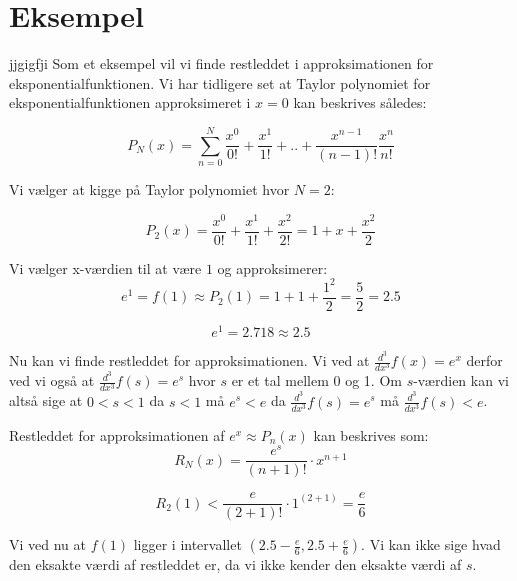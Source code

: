 \section{Eksempel}
jjgigfji
Som et eksempel vil vi finde restleddet i approksimationen for eksponentialfunktionen.
Vi har tidligere set at Taylor polynomiet for eksponentialfunktionen approksimeret i $x=0$ kan beskrives således:

\[
P_N(x)=\sum^{N}_{n=0}\frac{x^{0}}{0!}+\frac{x^{1}}{1!}+..+\frac{x^{n-1}}{(n-1)!}\frac{x^{n}}{n!}
\]

Vi vælger at kigge på Taylor polynomiet hvor $N=2$:

\[
P_2(x)=\frac{x^{0}}{0!}+\frac{x^{1}}{1!}+\frac{x^{2}}{2!}=1+x+\frac{x^{2}}{2}
\]

Vi vælger x-værdien til at være $1$ og approksimerer:
\[
e^{1}=f(1)\approx P_{2}(1)=1+1+\frac{1^{2}}{2}=\frac{5}{2}=2.5
\]

\[
e^{1}=2.718\approx 2.5
\]

Nu kan vi finde restleddet for approksimationen.
Vi ved at $\frac{d^3}{dx^3}f(x)=e^{x}$ derfor ved vi også at $\frac{d^3}{dx^3}f(s)=e^{s}$ hvor $s$ er et tal mellem 0 og 1. Om $s$-værdien kan vi altså sige at $0<s<1$ da $s<1$ må $e^{s}<e$ da $\frac{d^3}{dx^3}f(s)=e^{s}$ må $\frac{d^3}{dx^3}f(s)<e$.

Restleddet for approksimationen af $e^{x}\approx P_n(x)$ kan beskrives som:
\[
R_N(x)={\frac{e^{s}}{(n+1)!}}\cdot x^{n+1}
\]

\[
R_2(1)<\frac{e}{(2+1)!}\cdot1^{(2+1)}=\frac{e}{6}
\]

Vi ved nu at $f(1)$ ligger i intervallet $(2.5-\frac{e}{6} , 2.5+\frac{e}{6})$. Vi kan ikke sige hvad den eksakte værdi af restleddet er, da vi ikke kender den eksakte værdi af $s$.
